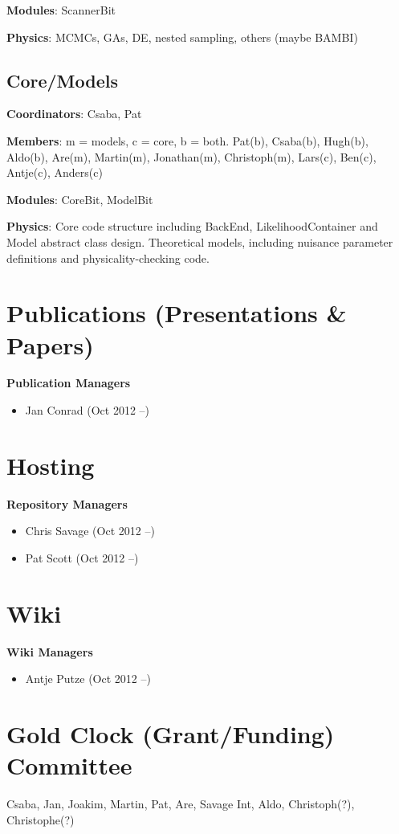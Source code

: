 \textbf{Modules}: ScannerBit

\textbf{Physics}: MCMCs, GAs, DE, nested sampling, others (maybe BAMBI)


\subsection{Core/Models}

\textbf{Coordinators}: Csaba, Pat

\textbf{Members}: m = models, c = core, b = both.  Pat(b), Csaba(b), Hugh(b), Aldo(b), Are(m), Martin(m), Jonathan(m), Christoph(m), Lars(c), Ben(c), Antje(c), Anders(c)

\textbf{Modules}: CoreBit, ModelBit

\textbf{Physics}: Core code structure including BackEnd, LikelihoodContainer and Model abstract class design. Theoretical models, including nuisance parameter definitions and physicality-checking code.


\section{Publications (Presentations \& Papers)}

\textbf{Publication Managers}
\begin{itemize}
\item Jan Conrad (Oct 2012 --)
\end{itemize}

\section{Hosting}

\textbf{Repository Managers}
\begin{itemize}
\item Chris Savage (Oct 2012 --)
\item Pat Scott (Oct 2012 --)
\end{itemize}

\section{Wiki}

\textbf{Wiki Managers}
\begin{itemize}
\item Antje Putze (Oct 2012 --)
\end{itemize}

\section{Gold Clock (Grant/Funding) Committee}
Csaba, Jan, Joakim, Martin, Pat, Are, Savage Int, Aldo, Christoph(?), Christophe(?)


